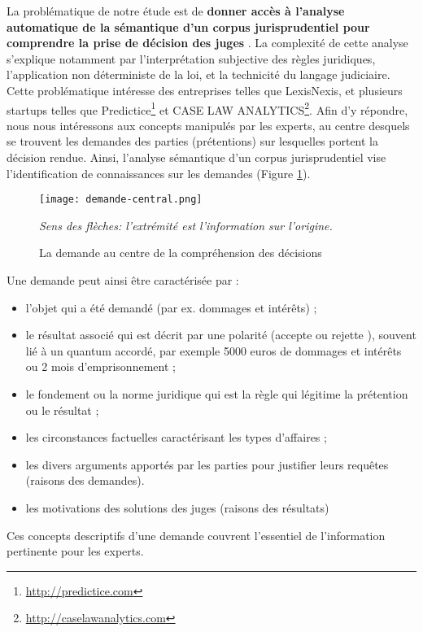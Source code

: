  La problématique de notre étude est de \og \textbf{donner accès à l'analyse automatique de la sémantique d'un corpus jurisprudentiel pour comprendre la prise de décision des juges} \fg{}. La complexité de cette analyse s'explique notamment par l'interprétation subjective des règles juridiques, l'application non déterministe de la loi, et la technicité du langage judiciaire. Cette problématique intéresse des entreprises telles que LexisNexis, et plusieurs startups  telles que Predictice\footnote{\url{http://predictice.com}} et CASE LAW ANALYTICS\footnote{\url{http://caselawanalytics.com}}. Afin d'y répondre, nous nous intéressons aux concepts manipulés par les experts, au centre desquels se trouvent les demandes des parties (prétentions) sur lesquelles portent la décision rendue. Ainsi, l'analyse sémantique d'un corpus jurisprudentiel vise
 l'identification de connaissances sur les demandes (Figure \ref{fig:intro:demande-central}).
 \begin{figure}[!htb]
 	\centering
 	\texttt{[image: demande-central.png]}
 	
 	\scriptsize{\textit{Sens des flèches: l'extrémité est l'information sur l'origine.}}
 	\caption{La demande au centre de la compréhension des décisions}
 	\label{fig:intro:demande-central}
 \end{figure} 

Une demande peut ainsi être caractérisée par :
 \begin{itemize}
 	\item l'objet qui a été demandé (par ex. dommages et intérêts) ;
	\item le résultat associé qui est décrit par une polarité (\og accepte \fg{} ou \og rejette \fg{}), souvent lié à un quantum accordé, par exemple 5000 euros de dommages et intérêts ou 2 mois d'emprisonnement ;
	\item le fondement ou la norme juridique qui est la règle qui légitime la prétention ou le résultat ;	
	\item les circonstances factuelles caractérisant les types d'affaires ;
	\item les divers arguments apportés par les parties pour justifier leurs requêtes  (raisons des demandes).
	\item les motivations des solutions des juges (raisons des résultats)
 \end{itemize}

Ces concepts descriptifs d'une demande couvrent l'essentiel de l'information pertinente pour les experts. 

